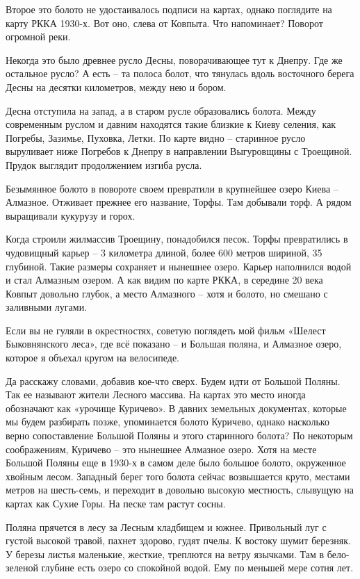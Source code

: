 Второе это болото не удостаивалось подписи на картах, однако поглядите на карту РККА 1930-х. Вот оно, слева от Ковпыта. Что напоминает? Поворот огромной реки.

Некогда это было древнее русло Десны, поворачивающее тут к Днепру. Где же остальное русло? А есть – та полоса болот, что тянулась вдоль восточного берега Десны на десятки километров, между нею и бором.

Десна отступила на запад, а в старом русле образовались болота. Между современным руслом и давним находятся такие близкие к Киеву селения, как Погребы, Зазимье, Пуховка, Летки. По карте видно – старинное русло выруливает ниже Погребов к Днепру в направлении Выгуровщины с Троещиной. Прудок выглядит продолжением изгиба русла.

Безымянное болото в повороте своем превратили в крупнейшее озеро Киева – Алмазное. Отживает прежнее его название, Торфы. Там добывали торф. А рядом выращивали кукурузу и горох.

Когда строили жилмассив Троещину, понадобился песок. Торфы превратились в чудовищный карьер – 3 километра длиной, более 600 метров шириной, 35 глубиной. Такие размеры сохраняет и нынешнее озеро. Карьер наполнился водой и стал Алмазным озером. А как видим по карте РККА, в середине 20 века Ковпыт довольно глубок, а место Алмазного – хотя и болото, но смешано с заливными лугами.

Если вы не гуляли в окрестностях, советую поглядеть мой фильм «Шелест Быковнянского леса», где всё показано – и Большая поляна, и Алмазное озеро, которое я объехал кругом на велосипеде.

Да расскажу словами, добавив кое-что сверх. Будем идти от Большой Поляны. Так ее называют жители Лесного массива. На картах это место иногда обозначают как «урочище Куричево». В давних земельных документах, которые мы будем разбирать позже, упоминается болото Куричево, однако насколько верно сопоставление Большой Поляны и этого старинного болота? По некоторым соображениям, Куричево – это нынешнее Алмазное озеро. Хотя на месте Большой Поляны еще в 1930-х в самом деле было большое болото, окруженное хвойным лесом. Западный берег того болота сейчас возвышается круто, местами метров на шесть-семь, и переходит в довольно высокую местность, слывущую на картах как Сухие Горы. На песке там растут сосны.

Поляна прячется в лесу за Лесным кладбищем и южнее. Привольный луг с густой высокой травой, пахнет здорово, гудят пчелы. К востоку шумит березняк. У березы листья маленькие, жесткие, треплются на ветру язычками. Там в бело-зеленой глубине есть озеро со спокойной водой. Ему по меньшей мере сотня лет.

